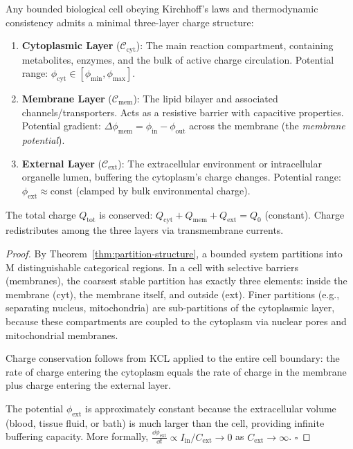 \begin{theorem}
\label{thm:three-layer-architecture}
Any bounded biological cell obeying Kirchhoff's laws and thermodynamic consistency admits a minimal three-layer charge structure:

\begin{enumerate}[label=(\Roman*), noitemsep]
\item \textbf{Cytoplasmic Layer} ($\mathcal{C}_{\text{cyt}}$): The main reaction compartment, containing metabolites, enzymes, and the bulk of active charge circulation. Potential range: $\phi_{\text{cyt}} \in [\phi_{\min}, \phi_{\max}]$.

\item \textbf{Membrane Layer} ($\mathcal{C}_{\text{mem}}$): The lipid bilayer and associated channels/transporters. Acts as a resistive barrier with capacitive properties. Potential gradient: $\Delta\phi_{\text{mem}} = \phi_{\text{in}} - \phi_{\text{out}}$ across the membrane (the \emph{membrane potential}).

\item \textbf{External Layer} ($\mathcal{C}_{\text{ext}}$): The extracellular environment or intracellular organelle lumen, buffering the cytoplasm's charge changes. Potential range: $\phi_{\text{ext}} \approx \text{const}$ (clamped by bulk environmental charge).
\end{enumerate}

The total charge $Q_{\text{tot}}$ is conserved: $Q_{\text{cyt}} + Q_{\text{mem}} + Q_{\text{ext}} = Q_0$ (constant). Charge redistributes among the three layers via transmembrane currents.
\end{theorem}

\begin{proof}
By Theorem~\ref{thm:partition-structure}, a bounded system partitions into M distinguishable categorical regions. In a cell with selective barriers (membranes), the coarsest stable partition has exactly three elements: inside the membrane (cyt), the membrane itself, and outside (ext). Finer partitions (e.g., separating nucleus, mitochondria) are sub-partitions of the cytoplasmic layer, because these compartments are coupled to the cytoplasm via nuclear pores and mitochondrial membranes.

Charge conservation follows from KCL applied to the entire cell boundary: the rate of charge entering the cytoplasm equals the rate of charge in the membrane plus charge entering the external layer.

The potential $\phi_{\text{ext}}$ is approximately constant because the extracellular volume (blood, tissue fluid, or bath) is much larger than the cell, providing infinite buffering capacity. More formally, $\frac{\dd \phi_{\text{ext}}}{\dd t} \propto I_{\text{in}}/C_{\text{ext}} \to 0$ as $C_{\text{ext}} \to \infty$. $\square$
\end{proof}


